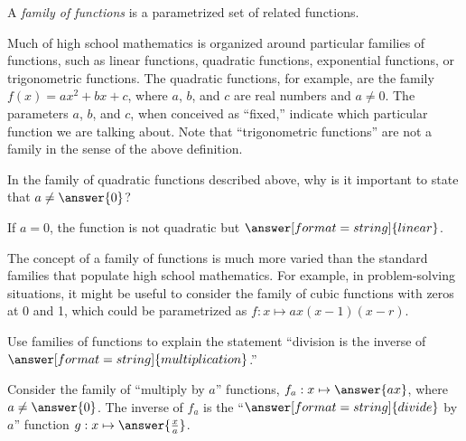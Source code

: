 \documentclass{ximera}
\begin{document}
\begin{definition}
A \emph{family of functions} is a parametrized set of related functions.  
\end{definition}

Much of high school mathematics is organized around particular families of functions, such as linear functions, quadratic functions, exponential functions, or trigonometric functions.  The quadratic functions, for example, are the family $f(x)=ax^2+bx+c$, where $a$, $b$, and $c$ are real numbers and $a\neq 0$.  The parameters $a$, $b$, and $c$, when conceived as ``fixed,'' indicate which particular function we are talking about.  Note that ``trigonometric functions'' are not a family in the sense of the above definition.  

\begin{question}
In the family of quadratic functions described above, why is it important to state that $a\neq \answer{0}$?
\begin{solution}
If $a=0$, the function is not quadratic but $\answer[format=string]{linear}$.
\end{solution}
\end{question}

The concept of a family of functions is much more varied than the standard families that populate high school mathematics.  For example, in problem-solving situations, it might be useful to consider the family of cubic functions with zeros at 0 and 1, which could be parametrized as $f:x\mapsto ax(x-1)(x-r)$.  

\begin{question}
Use families of functions to explain the statement ``division is the inverse of 
$\answer[format=string]{multiplication}$.''  
\begin{solution}
Consider the family of ``multiply by $a$'' functions, $f_a:x\mapsto \answer{ax}$, where $a\neq \answer{0}$.  The inverse of $f_a$ is the ``$\answer[format=string]{divide}$ by $a$'' function $g:x\mapsto \answer{\frac{x}{a}}$.   
\end{solution}
\end{question}



%
%
\end{document}
